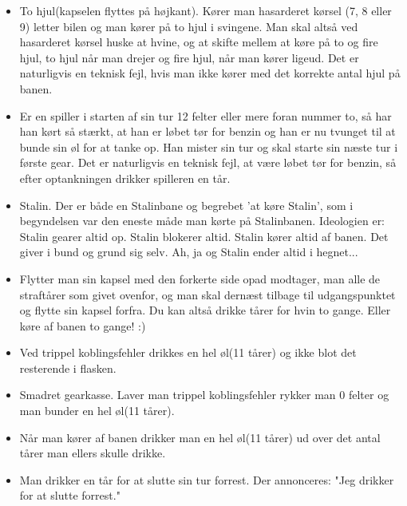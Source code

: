 \documentclass[12pt]{article}
\begin{document}
\begin{itemize}

\item To hjul(kapselen flyttes på højkant). Kører man hasarderet kørsel (7, 8 eller 9) letter bilen og man kører på to hjul i svingene. Man skal altså ved hasarderet kørsel huske at hvine, og at skifte mellem at køre på to og fire hjul, to hjul når man drejer og fire hjul, når man kører ligeud. Det er naturligvis en teknisk fejl, hvis man ikke kører med det korrekte antal hjul på banen.

\item Er en spiller i starten af sin tur 12 felter eller mere foran nummer to, så har han kørt så stærkt, at han er løbet tør for benzin og han er nu tvunget til at bunde sin øl for at tanke op. Han mister sin tur og skal starte sin næste tur i første gear. Det er naturligvis en teknisk fejl, at være løbet tør for benzin, så efter optankningen drikker spilleren en tår.

\item Stalin. Der er både en Stalinbane og begrebet 'at køre Stalin', som i begyndelsen var den eneste måde man kørte på Stalinbanen. Ideologien er: Stalin gearer altid op. Stalin blokerer altid. Stalin kører altid af banen. Det giver i bund og grund sig selv. Ah, ja og Stalin ender altid i hegnet...

\item Flytter man sin kapsel med den forkerte side opad modtager, man alle de straftårer som givet ovenfor, og man skal dernæst tilbage til udgangspunktet og flytte sin kapsel forfra. Du kan altså drikke tårer for hvin to gange. Eller køre af banen to gange! :)

\item Ved trippel koblingsfehler drikkes en hel øl(11 tårer) og ikke blot det resterende i flasken.

\item Smadret gearkasse. Laver man trippel koblingsfehler rykker man 0 felter og man bunder en hel øl(11 tårer).

\item Når man kører af banen drikker man en hel øl(11 tårer) ud over det antal tårer man ellers skulle drikke.

\item Man drikker en tår for at slutte sin tur forrest. Der annonceres: "Jeg drikker for at slutte forrest."

\end{itemize}

\newpage
\end{document}

